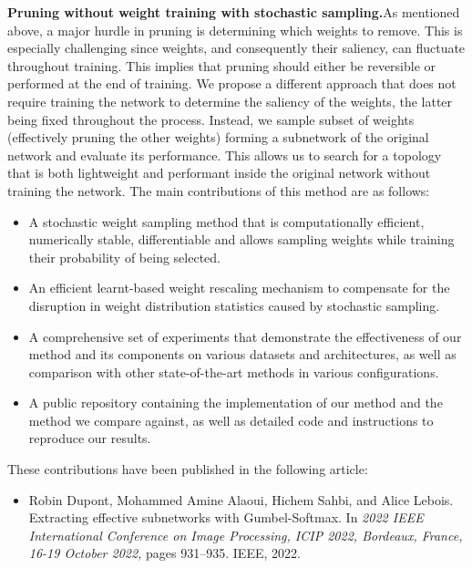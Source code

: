 \noindent \textbf{Pruning without weight training with stochastic sampling.}As
mentioned above, a major hurdle in pruning is determining which weights to
remove. This is especially challenging since weights, and consequently their
saliency, can fluctuate throughout training. This implies that pruning should
either be reversible or performed at the end of training. We propose a different
approach that does not require training the network to determine the saliency of
the weights, the latter being fixed throughout the process. Instead, we sample
subset of weights (effectively pruning the other weights) forming a subnetwork
of the original network and evaluate its performance. This allows us to search
for a topology that is both lightweight and performant inside the original
network without training the network. The main contributions of this method are
as follows: \\

\begin{itemize}
    \item A stochastic weight sampling method that is computationally efficient,
          numerically stable, differentiable and allows sampling weights while
          training their probability of being selected.
    \item An efficient learnt-based weight rescaling mechanism to compensate for
          the disruption in weight distribution statistics caused by stochastic
          sampling.
    \item A comprehensive set of experiments that demonstrate the effectiveness
          of our method and its components on various datasets and architectures, as
          well as comparison with other state-of-the-art methods in various
          configurations.
    \item A public repository containing the implementation of our method and
          the method we compare against, as well as detailed code and instructions to
          reproduce our results.\\
\end{itemize}

\noindent These contributions have been published in the following article:
\begin{itemize}
    \item Robin Dupont, Mohammed Amine Alaoui, Hichem Sahbi, and Alice
          Lebois. Extracting effective subnetworks with Gumbel-Softmax. In \textit{2022
              IEEE International Conference on Image Processing, ICIP 2022, Bordeaux,
              France, 16-19 October 2022,} pages 931–935. IEEE, 2022.\\
\end{itemize}

